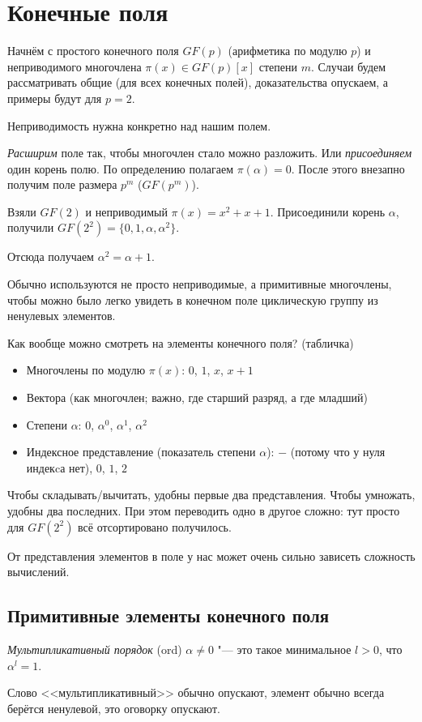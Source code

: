 \section{Конечные поля}
Начнём с простого конечного поля $GF(p)$ (арифметика по модулю $p$)
и неприводимого многочлена $\pi(x) \in GF(p)[x]$ степени $m$.
Случаи будем рассматривать общие (для всех конечных полей), доказательства опускаем,
а примеры будут для $p=2$.

\begin{Rem}
Неприводимость нужна конкретно над нашим полем.
\end{Rem}

\textit{Расширим} поле так, чтобы многочлен стало можно разложить.
Или \textit{присоединяем} один корень полю.
По определению полагаем $\pi(\alpha)=0$.
После этого внезапно получим поле размера $p^m$ ($GF(p^m)$).

\begin{exmp}
Взяли $GF(2)$ и неприводимый $\pi(x)=x^2+x+1$.
Присоединили корень $\alpha$, получили $GF(2^2)=\{0, 1, \alpha, \alpha^2\}$.

Отсюда получаем $\alpha^2=\alpha+1$.
\end{exmp}

\begin{Rem}
Обычно используются не просто неприводимые, а примитивные многочлены,
чтобы можно было легко увидеть в конечном поле циклическую группу
из ненулевых элементов.
\end{Rem}

Как вообще можно смотреть на элементы конечного поля? (табличка)
\begin{itemize}
\item Многочлены по модулю $\pi(x)$: $0$, $1$, $x$, $x+1$
\item Вектора (как многочлен; важно, где старший разряд, а где младший)
\item Степени $\alpha$: $0$, $\alpha^0$, $\alpha^1$, $\alpha^2$
\item Индексное представление (показатель степени $\alpha$): $-$ (потому что у нуля индекcа нет), $0$, $1$, $2$
\end{itemize}
Чтобы складывать/вычитать, удобны первые два представления.
Чтобы умножать, удобны два последних.
При этом переводить одно в другое сложно: тут просто для $GF(2^2)$ всё отсортировано получилось.

От представления элементов в поле у нас может очень сильно зависеть сложность вычислений.

\subsection{Примитивные элементы конечного поля}
\begin{Def}
	\textit{Мультипликативный порядок} (ord) $\alpha \neq 0$ "--- это
	такое минимальное $l>0$, что $\alpha^l=1$.
\end{Def}
\begin{Rem}
	Слово <<мультипликативный>> обычно опускают, элемент
	обычно всегда берётся ненулевой, это оговорку опускают.
\end{Rem}

